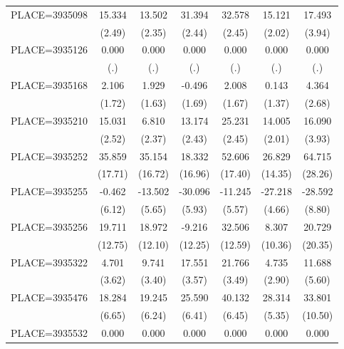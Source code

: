 {\begin{tabular}{l*{6}{c}}
PLACE=3935098       &      15.334&      13.502&      31.394&      32.578&      15.121&      17.493\\
                    &      (2.49)&      (2.35)&      (2.44)&      (2.45)&      (2.02)&      (3.94)\\
PLACE=3935126       &       0.000&       0.000&       0.000&       0.000&       0.000&       0.000\\
                    &         (.)&         (.)&         (.)&         (.)&         (.)&         (.)\\
PLACE=3935168       &       2.106&       1.929&      -0.496&       2.008&       0.143&       4.364\\
                    &      (1.72)&      (1.63)&      (1.69)&      (1.67)&      (1.37)&      (2.68)\\
PLACE=3935210       &      15.031&       6.810&      13.174&      25.231&      14.005&      16.090\\
                    &      (2.52)&      (2.37)&      (2.43)&      (2.45)&      (2.01)&      (3.93)\\
PLACE=3935252       &      35.859&      35.154&      18.332&      52.606&      26.829&      64.715\\
                    &     (17.71)&     (16.72)&     (16.96)&     (17.40)&     (14.35)&     (28.26)\\
PLACE=3935255       &      -0.462&     -13.502&     -30.096&     -11.245&     -27.218&     -28.592\\
                    &      (6.12)&      (5.65)&      (5.93)&      (5.57)&      (4.66)&      (8.80)\\
PLACE=3935256       &      19.711&      18.972&      -9.216&      32.506&       8.307&      20.729\\
                    &     (12.75)&     (12.10)&     (12.25)&     (12.59)&     (10.36)&     (20.35)\\
PLACE=3935322       &       4.701&       9.741&      17.551&      21.766&       4.735&      11.688\\
                    &      (3.62)&      (3.40)&      (3.57)&      (3.49)&      (2.90)&      (5.60)\\
PLACE=3935476       &      18.284&      19.245&      25.590&      40.132&      28.314&      33.801\\
                    &      (6.65)&      (6.24)&      (6.41)&      (6.45)&      (5.35)&     (10.50)\\
PLACE=3935532       &       0.000&       0.000&       0.000&       0.000&       0.000&       0.000\\

\end{tabular}}

